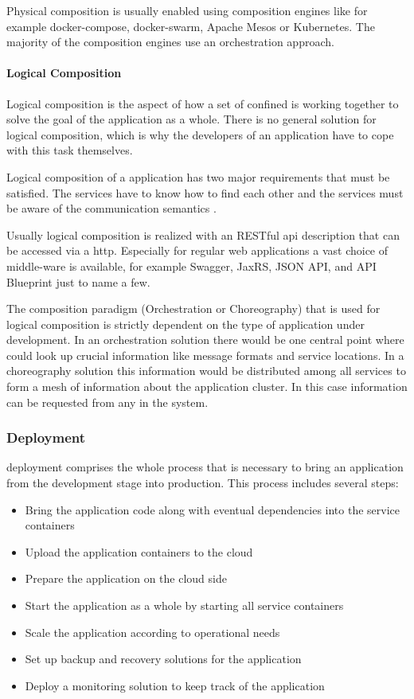 Physical composition is usually enabled using composition engines like for
example docker-compose, docker-swarm, Apache Mesos or Kubernetes. The majority
of the composition engines use an orchestration approach. 

\paragraph{Logical Composition}

Logical composition is the aspect of how a set of confined \mss{} is working
together to solve the goal of the application as a whole. There is no
general solution for logical composition, which is why the developers of an
application have to cope with this task themselves.

Logical composition of a \ms{} application has two major requirements that must
be satisfied. The services have to know how to find each other
\cite{rotter2017telecom} and the services must be aware of the communication
semantics \cite{oberhauser2016microflows}.

Usually logical composition is realized with an RESTful \gls{api} description
that can be accessed via a \gls{http}. Especially for regular web applications a
vast choice of middle-ware is available, for example Swagger, JaxRS, JSON API,
and API Blueprint just to name a few.

The composition paradigm (Orchestration or Choreography) that is used for
logical composition is strictly dependent on the type of application under
development. In an orchestration solution there would be one central point where
\mss{} could look up crucial information like message formats and service
locations. In a choreography solution this information would be distributed
among all services to form a mesh of information about the application cluster.
In this case information can be requested from any \ms{} in the system.

\subsubsection{\msuc{} Deployment}

\msuc{} deployment comprises the whole process that is necessary to bring an
application from the development stage into production. This process includes
several steps:

\begin{itemize}
  \item Bring the application code along with eventual dependencies into the
  service containers
  \item Upload the application containers to the cloud
  \item Prepare the application on the cloud side
  \item Start the application as a whole by starting all service containers
  \item Scale the application according to operational needs
  \item Set up backup and recovery solutions for the application
  \item Deploy a monitoring solution to keep track of the application
\end{itemize}

